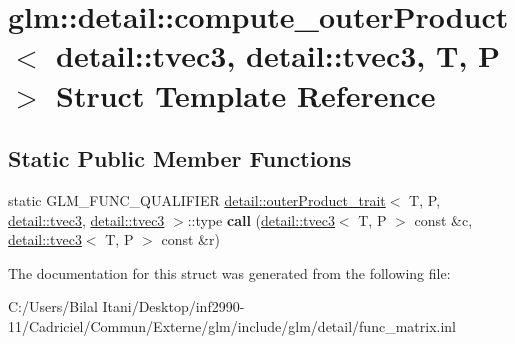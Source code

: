 \hypertarget{structglm_1_1detail_1_1compute__outer_product_3_01detail_1_1tvec3_00_01detail_1_1tvec3_00_01_t_00_01_p_01_4}{}\section{glm\+:\+:detail\+:\+:compute\+\_\+outer\+Product$<$ detail\+:\+:tvec3, detail\+:\+:tvec3, T, P $>$ Struct Template Reference}
\label{structglm_1_1detail_1_1compute__outer_product_3_01detail_1_1tvec3_00_01detail_1_1tvec3_00_01_t_00_01_p_01_4}
\subsection*{Static Public Member Functions}
\begin{DoxyCompactItemize}
\item 
static G\+L\+M\+\_\+\+F\+U\+N\+C\+\_\+\+Q\+U\+A\+L\+I\+F\+I\+ER \hyperlink{structglm_1_1detail_1_1outer_product__trait}{detail\+::outer\+Product\+\_\+trait}$<$ T, P, \hyperlink{structglm_1_1detail_1_1tvec3}{detail\+::tvec3}, \hyperlink{structglm_1_1detail_1_1tvec3}{detail\+::tvec3} $>$\+::type {\bfseries call} (\hyperlink{structglm_1_1detail_1_1tvec3}{detail\+::tvec3}$<$ T, P $>$ const \&c, \hyperlink{structglm_1_1detail_1_1tvec3}{detail\+::tvec3}$<$ T, P $>$ const \&r)\hypertarget{structglm_1_1detail_1_1compute__outer_product_3_01detail_1_1tvec3_00_01detail_1_1tvec3_00_01_t_00_01_p_01_4_ab97eae3a1827791b1e9e3324ea454b2d}{}\label{structglm_1_1detail_1_1compute__outer_product_3_01detail_1_1tvec3_00_01detail_1_1tvec3_00_01_t_00_01_p_01_4_ab97eae3a1827791b1e9e3324ea454b2d}

\end{DoxyCompactItemize}


The documentation for this struct was generated from the following file\+:\begin{DoxyCompactItemize}
\item 
C\+:/\+Users/\+Bilal Itani/\+Desktop/inf2990-\/11/\+Cadriciel/\+Commun/\+Externe/glm/include/glm/detail/func\+\_\+matrix.\+inl\end{DoxyCompactItemize}
